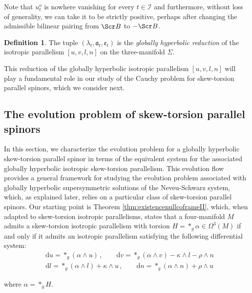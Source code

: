 \documentclass[10pt,reqno,a4paper]{amsart}
\theoremstyle{plain}
\theoremstyle{definition}
\newtheorem{definition}[thm]{Definition}
\theoremstyle{remark}
\theoremstyle{remark}
\def\dd{\mathrm{d}}
\def\cB{\Scr B}
\def\cI{\mathcal{I}}
\def\fra{\mathfrak{a}}
\def\fre{\mathfrak{e}}
\renewcommand{\(}{ (}
\renewcommand{\)}{ )}
\begin{document}
\noindent
Note that $u_t^o$ is nowhere vanishing for every $t\in\cI$ and furthermore, without loss of generality, we can take it to be strictly positive, perhaps after changing the admissible bilinear pairing from $\cB$ to $-\cB$.  

\begin{definition}
The tuple $(\lambda_t,\fra_t,\fre_t)$ is the \emph{globally hyperbolic reduction} of the isotropic parallelism $[u,v,l,n]$ on the three-manifold $\Sigma$.
\end{definition}

\noindent
This reduction of the globally hyperbolic isotropic parallelism $[u,v,l,n]$ will play a fundamental role in our study of the Cauchy problem for skew-torsion parallel spinors, which we consider next.

%

\subsection{The evolution problem of skew-torsion parallel spinors}
\label{sec:evolutionskewtorsion}

%

In this section, we characterize the evolution problem for a globally hyperbolic skew-torsion parallel spinor in terms of the equivalent system for the associated globally hyperbolic isotropic skew-torsion parallelism. This evolution flow provides a general framework for studying the evolution problem associated with globally hyperbolic supersymmetric solutions of the Neveu-Schwarz system, which, as explained later, relies on a particular class of skew-torsion parallel spinors. Our starting point is Theorem \ref{thm:existencenullcoframeII}, which, when adapted to skew-torsion isotropic parallelisms, states that a four-manifold $M$ admits a skew-torsion isotropic parallelism with torsion $H = \ast_g \alpha \in \Omega^3(M)$ if and only if it admits an isotropic parallelism satisfying the following differential system:
\begin{eqnarray}
& \dd u = \ast_g(\alpha\wedge u)  \, , \qquad \dd v = \ast_g(\alpha\wedge v)  - \kappa\wedge l - \rho\wedge n   \label{eq:duvtorsiongeneralII}\\
& \dd l = \ast_g(\alpha\wedge l) + \kappa\wedge u \, , \qquad \dd n = \ast_g(\alpha\wedge n) + \rho\wedge u   \label{eq:dlntorsiongeneralII}
\end{eqnarray}

\noindent
where $\alpha = \ast_g H$. 
\end{document}
